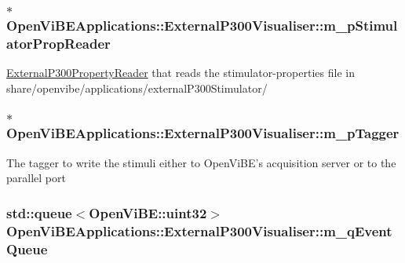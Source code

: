 \label{classOpenViBEApplications_1_1ExternalP300Visualiser_a4f56254ed488ec70b79c61116c2b4739}
\hypertarget{classOpenViBEApplications_1_1ExternalP300Visualiser_a1e6cc7a87f3033f5118a2de7c6b850c4}{
\subsubsection[{m\_\-pStimulatorPropReader}]{$\ast$ {\bf OpenViBEApplications::ExternalP300Visualiser::m\_\-pStimulatorPropReader}}}
\label{classOpenViBEApplications_1_1ExternalP300Visualiser_a1e6cc7a87f3033f5118a2de7c6b850c4}
\hyperlink{classOpenViBEApplications_1_1ExternalP300PropertyReader}{ExternalP300PropertyReader} that reads the stimulator-\/properties file in share/openvibe/applications/externalP300Stimulator/ \hypertarget{classOpenViBEApplications_1_1ExternalP300Visualiser_a4358bd9d5623138cd6a5516e988536b2}{
\subsubsection[{m\_\-pTagger}]{$\ast$ {\bf OpenViBEApplications::ExternalP300Visualiser::m\_\-pTagger}}}
\label{classOpenViBEApplications_1_1ExternalP300Visualiser_a4358bd9d5623138cd6a5516e988536b2}
The tagger to write the stimuli either to OpenViBE's acquisition server or to the parallel port \hypertarget{classOpenViBEApplications_1_1ExternalP300Visualiser_a04a821adef1b94191723146578ae3669}{
\subsubsection[{m\_\-qEventQueue}]{\setlength{\rightskip}{0pt plus 5cm}std::queue$<$OpenViBE::uint32$>$ {\bf OpenViBEApplications::ExternalP300Visualiser::m\_\-qEventQueue}}}
